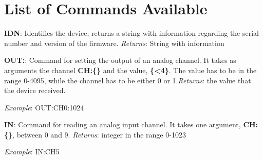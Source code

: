 \section{List of Commands Available}\label{list-of-commandsavailable}
\textbf{{IDN}}: Identifies the device; returns a string with information
regarding the serial number and version of the firmware. \emph{Returns}:
String with information

\textbf{{OUT}:}: Command for setting the output of an analog channel. It
takes as arguments the channel \textbf{{CH}:\{\}} and the value,
\textbf{\{\textless{}4\}}. The value has to be in the range 0-4095,
while the channel has to be either 0 or 1.\emph{Returns}: the value that the device received.

\emph{Example}: {OUT}:{CH0}:1024

\textbf{{IN}}: Command for reading an analog input channel. It takes one
argument, \textbf{{CH}:\{\}}, between 0 and 9. \emph{Returns}: integer
in the range 0-1023

\emph{Example}: {IN}:{CH5}